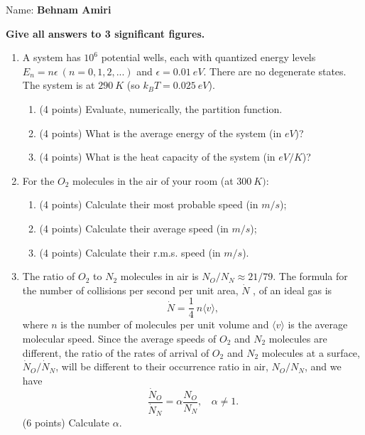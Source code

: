 \documentclass[fleqn]{article}
\begin{document}
  Name: \textbf{Behnam Amiri}

  \vspace{1cm}

  \textbf{Give all answers to 3 significant figures.}

  \begin{enumerate}
    \item A system has $10^6$ potential wells, each with quantized energy levels $E_n=n \epsilon ~ (n=0,1,2,...)$
    and $\epsilon=0.01 ~ eV$. There are no degenerate states. The system is at $290 ~ K$ (so $k_B T=0.025 ~ eV$).
      \begin{enumerate}
        \item (4 points) Evaluate, numerically, the partition function.


        \item (4 points) What is the average energy of the system (in $eV$)?


        \item (4 points) What is the heat capacity of the system (in $eV/K$)?
      \end{enumerate}
    
    \item For the $O_2$ molecules in the air of your room (at $300 ~ K)$:
      \begin{enumerate}
        \item (4 points) Calculate their most probable speed (in $m/s$);

        \item (4 points) Calculate their average speed (in $m/s$);

        \item (4 points) Calculate their r.m.s. speed (in $m/s$).

      \end{enumerate}

    \item The ratio of $O_2$ to $N_2$ molecules in air is $N_O/ N_N \approx 21/79.$
    The formula for the number of collisions per second per unit area, $\dot{N}$ , of an ideal gas is
    $$
      \dot{N}=\dfrac{1}{4} ~ n \langle v \rangle,
    $$
    where $n$ is the number of molecules per unit volume and $\langle v \rangle$ is the average molecular speed.
    Since the average speeds of $O_2$ and $N_2$ molecules are different, the ratio of the rates of arrival
    of $O_2$ and $N_2$ molecules at a surface, $\dot{N}_O/\dot{N}_N$, will be different to their occurrence ratio in air,
    $N_O/ N_N$, and we have
    $$
      \dfrac{\dot{N}_O}{\dot{N}_N}=\alpha \dfrac{N_O}{N_N}, ~~~~ \alpha \neq 1.
    $$
    (6 points) Calculate $\alpha$.

  \end{enumerate}
\end{document}
